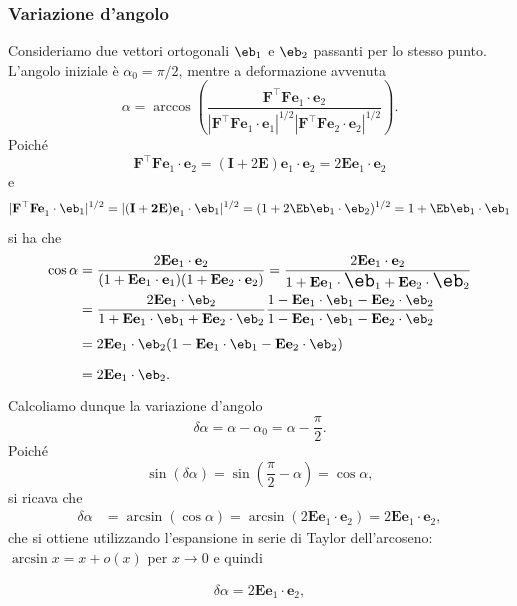 \subsubsection{Variazione d'angolo}
Consideriamo due vettori ortogonali $\eb_{1}$ e $\eb_2$ passanti per lo stesso punto. L'angolo iniziale è $\alpha_0=\pi/2$, mentre a deformazione avvenuta
\begin{equation}
	\alpha=\arccos\left(\frac{\mathbf{F^{\top}Fe}_1\cdot\mathbf{e}_2}{|\mathbf{F^{\top}Fe}_1\cdot\mathbf{e}_1|^{1/2}|\mathbf{F^{\top}Fe}_2\cdot\mathbf{e}_2|^{1/2}}\right).
\end{equation}
Poiché
\begin{equation}
	\mathbf{F^{\top}Fe}_1\cdot\mathbf{e}_2=(\mathbf{I}+2\mathbf{E})\mathbf{e}_1\cdot\mathbf{e}_2=2\mathbf{Ee}_1\cdot\mathbf{e}_2
\end{equation}
e 
\begin{equation}
	\mathbf{|F^{\top}Fe}_1\cdot \eb_1|^{1/2}=\mathbf{|(I+2E)e}_1\cdot \eb_1|^{1/2}=(1+2\Eb\eb_1\cdot \eb_2)^{1/2}=1+\Eb\eb_1\cdot \eb_1
\end{equation}
si ha che
\begin{equation}
	\begin{aligned}
		\cos\alpha & \Large=\frac{2\mathbf{Ee}_1\cdot\mathbf{e}_2}{(1+\mathbf{Ee}_1\cdot\mathbf{e}_1)(1+\mathbf{Ee}_2\cdot\mathbf{e}_2)}=\frac{2\mathbf{Ee}_1\cdot\mathbf{e}_2}{1+\mathbf{Ee}_1\cdot\eb_1+\mathbf{Ee}_2\cdot\eb_2}  \\
		&=\frac{2\mathbf{Ee}_1\cdot\eb_2}{1+\mathbf{Ee}_1\cdot\eb_1+\mathbf{Ee}_2\cdot\eb_2}\frac{1-\mathbf{Ee}_1\cdot\eb_1-\mathbf{Ee}_2\cdot\eb_2}{1-\mathbf{Ee}_1\cdot\eb_1-\mathbf{Ee}_2\cdot\eb_2} \\
		&=2\mathbf{Ee}_1\cdot\eb_2(1-\mathbf{Ee}_1\cdot\eb_1-\mathbf{Ee}_2\cdot\eb_2) \\
		&=2\mathbf{Ee}_1\cdot\eb_2.
	\end{aligned}
\end{equation}
Calcoliamo dunque la variazione d'angolo
\begin{equation}
	\delta\alpha=\alpha-\alpha_0=\alpha-\frac{\pi}{2}.
\end{equation}
Poiché
\begin{equation}
	\sin(\delta\alpha)=\sin(\frac\pi2-\alpha)=\cos\alpha,
\end{equation}
si ricava che
\begin{equation}
	\begin{aligned}\delta\alpha&=\arcsin(\cos\alpha)=\arcsin(2\mathbf{Ee}_1\cdot\mathbf{e}_2)=2\mathbf{Ee}_1\cdot\mathbf{e}_2,\end{aligned}
\end{equation}
che si ottiene  utilizzando l’espansione in serie di Taylor dell'arcoseno: $\arcsin x=x+o(x)$ per $x\to 0$ e quindi
\begin{definition}
	\begin{equation}\label{E12}
	\begin{aligned}\delta\alpha=2\mathbf{Ee}_1\cdot\mathbf{e}_2,\end{aligned}
\end{equation}
\end{definition}


